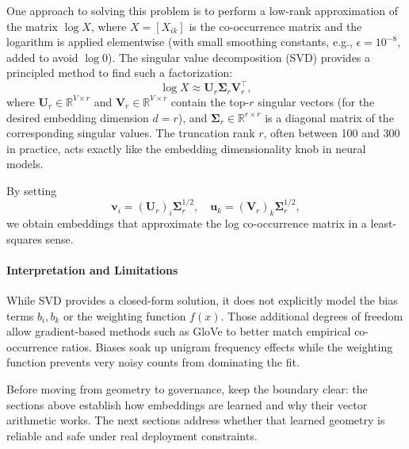 One approach to solving this problem is to perform a low-rank approximation of the matrix \( \log X \), where \( X = [X_{ik}] \) is the co-occurrence matrix and the logarithm is applied elementwise (with small smoothing constants, e.g., \(\epsilon = 10^{-8}\), added to avoid \(\log 0\)). The singular value decomposition (SVD) provides a principled method to find such a factorization:
\begin{equation}
    \log X \approx \mathbf{U}_r \boldsymbol{\Sigma}_r \mathbf{V}_r^\top,
    \label{eq:svd}
\end{equation}
where \(\mathbf{U}_r \in \mathbb{R}^{V \times r}\) and \(\mathbf{V}_r \in \mathbb{R}^{V \times r}\) contain the top-\(r\) singular vectors (for the desired embedding dimension \(d=r\)), and \(\boldsymbol{\Sigma}_r \in \mathbb{R}^{r \times r}\) is a diagonal matrix of the corresponding singular values. The truncation rank \(r\), often between 100 and 300 in practice, acts exactly like the embedding dimensionality knob in neural models.

By setting
\[
\mathbf{v}_i = (\mathbf{U}_r)_i \boldsymbol{\Sigma}_r^{1/2}, \quad \mathbf{u}_k = (\mathbf{V}_r)_k \boldsymbol{\Sigma}_r^{1/2},
\]
we obtain embeddings that approximate the log co-occurrence matrix in a least-squares sense.

\paragraph{Interpretation and Limitations}

While SVD provides a closed-form solution, it does not explicitly model the bias terms \( b_i, b_k \) or the weighting function \( f(x) \). Those additional degrees of freedom allow gradient-based methods such as GloVe to better match empirical co-occurrence ratios. Biases soak up unigram frequency effects while the weighting function prevents very noisy counts from dominating the fit.

Before moving from geometry to governance, keep the boundary clear: the sections above establish how embeddings are learned and why their vector arithmetic works. The next sections address whether that learned geometry is reliable and safe under real deployment constraints.

